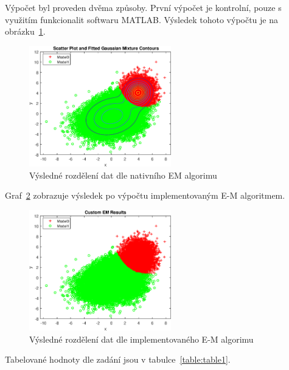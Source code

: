 Výpočet byl proveden dvěma způsoby.
První výpočet je kontrolní, pouze s využitím funkcionalit softwaru MATLAB.
Výsledek tohoto výpočtu je na obrázku~\ref{fig:result2}.

\begin{figure}[htb]
    \centering
    \includegraphics[width=0.55\textwidth]{graphs/fig2.eps}
    \caption{Výsledné rozdělení dat dle nativního EM algorimu}
    \label{fig:result2}
\end{figure}
\FloatBarrier

Graf~\ref{fig:result3} zobrazuje výsledek po výpočtu implementovaným E-M algoritmem.

\begin{figure}[htb]
    \centering
    \includegraphics[width=0.55\textwidth]{graphs/fig3.eps}
    \caption{Výsledné rozdělení dat dle implementovaného E-M algorimu}
    \label{fig:result3}
\end{figure}
\FloatBarrier

Tabelované hodnoty dle zadání jsou v tabulce~\ref{table:table1}.

